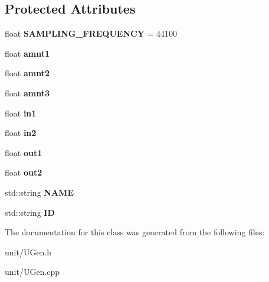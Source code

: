 \subsection*{Protected Attributes}
\begin{DoxyCompactItemize}
\item 
float {\bfseries S\+A\+M\+P\+L\+I\+N\+G\+\_\+\+F\+R\+E\+Q\+U\+E\+N\+CY} = 44100\hypertarget{classUGen_a0db8d2e9778b5d9f093eefcbdc2c9d89}{}\label{classUGen_a0db8d2e9778b5d9f093eefcbdc2c9d89}

\item 
float {\bfseries amnt1}\hypertarget{classUGen_ae858237d38f3cc95144b64fa047ac37b}{}\label{classUGen_ae858237d38f3cc95144b64fa047ac37b}

\item 
float {\bfseries amnt2}\hypertarget{classUGen_aa2e389fc2267db7843209f2a21fe8b43}{}\label{classUGen_aa2e389fc2267db7843209f2a21fe8b43}

\item 
float {\bfseries amnt3}\hypertarget{classUGen_a05da12719a925b3e73467a82ed410b10}{}\label{classUGen_a05da12719a925b3e73467a82ed410b10}

\item 
float {\bfseries in1}\hypertarget{classUGen_a6633122030153c6685c6b654b7c45974}{}\label{classUGen_a6633122030153c6685c6b654b7c45974}

\item 
float {\bfseries in2}\hypertarget{classUGen_acbb0ab4228fbfbe61f4dffd022303d52}{}\label{classUGen_acbb0ab4228fbfbe61f4dffd022303d52}

\item 
float {\bfseries out1}\hypertarget{classUGen_ad347230d1fca8ba33d8ee9f64bfb73cc}{}\label{classUGen_ad347230d1fca8ba33d8ee9f64bfb73cc}

\item 
float {\bfseries out2}\hypertarget{classUGen_a27053388a03f59fc135af48bab560d2c}{}\label{classUGen_a27053388a03f59fc135af48bab560d2c}

\item 
std\+::string {\bfseries N\+A\+ME}\hypertarget{classUGen_aa1bdc53d037fbcc73c52d7bf92a1064e}{}\label{classUGen_aa1bdc53d037fbcc73c52d7bf92a1064e}

\item 
std\+::string {\bfseries ID}\hypertarget{classUGen_a1e26df186fdde33f8b3c84c97f92db2e}{}\label{classUGen_a1e26df186fdde33f8b3c84c97f92db2e}

\end{DoxyCompactItemize}


The documentation for this class was generated from the following files\+:\begin{DoxyCompactItemize}
\item 
unit/U\+Gen.\+h\item 
unit/U\+Gen.\+cpp\end{DoxyCompactItemize}
